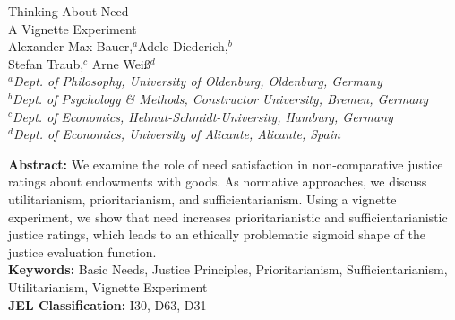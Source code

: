 \documentclass[12pt]{scrartcl}
\begin{document}
\thispagestyle{empty}
\renewcommand{\thefootnote}{\fnsymbol{footnote}}
\begin{center}
{\LARGE Thinking About Need}\\\vspace{2ex}
{\Large A Vignette Experiment}\\\vspace{6ex}
{\large Alexander Max Bauer,$^a$\footnotemark[1] Adele Diederich,$^b$\\Stefan Traub,$^{c}$ Arne Weiß$^d$}\\\vspace{3ex}
\textsl{\small $^{a}$Dept. of Philosophy, University of Oldenburg, Oldenburg, Germany}\\\vspace{1ex}
\textsl{\small $^{b}$Dept. of Psychology \& Methods, Constructor University, Bremen, Germany}\\\vspace{1ex}
\textsl{\small $^{c}$Dept. of Economics, Helmut-Schmidt-University, Hamburg, Germany}\\\vspace{1ex}
\textsl{\small $^{d}$Dept. of Economics, University of Alicante, Alicante, Spain}\\\vspace{3ex}
\end{center}

\vspace{\fill}

\noindent\textbf{Abstract:} We examine the role of need satisfaction in non-comparative justice ratings about endowments with goods. 
As normative approaches, we discuss utilitarianism, prioritarianism, and sufficientarianism.
Using a vignette experiment, we show that need increases prioritarianistic and sufficientarianistic justice ratings, which leads to an ethically problematic sigmoid shape of the justice evaluation function.
\\[2ex]
\noindent\textbf{Keywords:} Basic Needs, Justice Principles, Prioritarianism, Sufficientarianism, Utilitarianism, Vignette Experiment\\[2ex]
\textbf{JEL Classification:} I30, D63, D31

\renewcommand{\thefootnote}{\arabic{footnote}}\setcounter{footnote}{0}
\newpage
\end{document}
